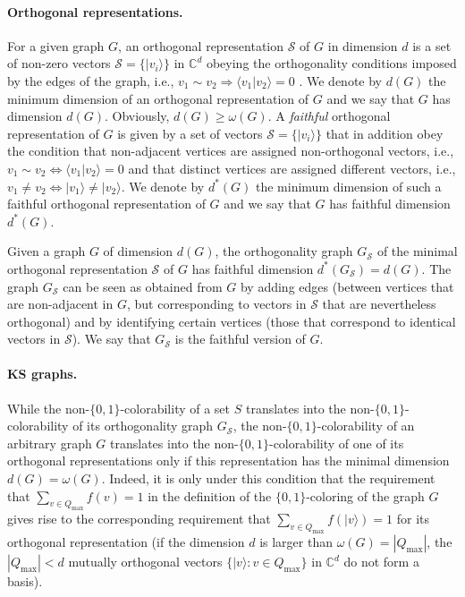 \documentclass[twocolumn, a4paper, superscriptaddress,nofootinbib, accepted=2020-08-07, hyperref]{quantumarticle}
\begin{document}
\paragraph*{Orthogonal representations.}
For a given graph $G$, an orthogonal representation $\mathcal{S}$ of $G$ in dimension $d$ is a set of non-zero vectors $\mathcal{S}=\{|v_i \rangle\}$ in $\mathbb{C}^d$ obeying the orthogonality conditions imposed by the edges of the graph, i.e., $v_1 \sim v_2 \Rightarrow \langle v_1|v_2 \rangle=0$ \cite{Lovasz87}. We denote by $d(G)$ the minimum dimension of an orthogonal representation of $G$ and we say that $G$ has dimension $d(G)$. Obviously, $d(G)\geq \omega(G)$. A \emph{faithful} orthogonal representation of $G$ is given by a set of vectors $\mathcal{S}=\{|v_i \rangle\}$ that in addition obey the condition that non-adjacent vertices are assigned non-orthogonal vectors, i.e., $v_1 \sim v_2 \Leftrightarrow  \langle v_1|v_2 \rangle=0$ and that distinct vertices are assigned different vectors, i.e., $v_1 \neq v_2 \Leftrightarrow |v_1 \rangle \neq |v_2 \rangle$.
We denote by $d^*(G)$ the minimum dimension of such a faithful orthogonal representation of $G$ and we say that $G$ has faithful dimension $d^*(G)$.

Given a graph $G$ of dimension $d(G)$, the orthogonality graph $G_\mathcal{S}$ of the minimal orthogonal representation $\mathcal{S}$ of $G$ has faithful dimension $d^*(G_\mathcal{S})=d(G)$. The graph $G_\mathcal{S}$ can be seen as obtained from $G$ by adding edges (between vertices that are non-adjacent in $G$, but corresponding to vectors in $\mathcal{S}$ that are nevertheless orthogonal) and by identifying certain vertices (those that correspond to identical vectors in $\mathcal{S}$). We say that $G_\mathcal{S}$ is the faithful version of $G$.


\paragraph*{KS graphs.}
While the non-$\{0,1\}$-colorability of a set $S$ translates into the non-$\{0,1\}$-colorability of its orthogonality graph $G_\mathcal{S}$, the non-$\{0,1\}$-colorability of an arbitrary graph $G$ translates into the non-$\{0,1\}$-colorability of one of its orthogonal representations only if this representation has the minimal dimension $d(G)=\omega(G)$. Indeed, it is only under this condition that the requirement that $\sum_{v \in Q_{\max}} f(v) = 1$ in the definition of the $\{0,1\}$-coloring of the graph $G$ gives rise to the corresponding requirement that $\sum_{v\in Q_{\max}} f(|v\rangle)  = 1$ for its orthogonal representation (if the dimension $d$ is larger than $\omega(G)=|Q_{\max}|$, the $|Q_{\max}|<d$ mutually orthogonal vectors $\{|v\rangle:v\in Q_{\max}\}$ in $\mathbb{C}^d$ do not form a basis).
\end{document}
